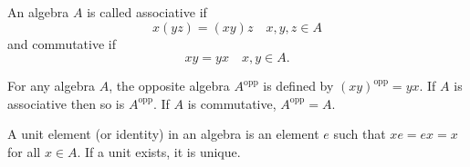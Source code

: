An algebra $A$ is called associative if
$$x(yz) = (xy)z \quad x, y, z \in A$$
and commutative if
$$xy = yx \quad x, y \in A.$$

For any algebra $A$, the opposite algebra $A^{\operatorname{opp}}$ is defined by $(xy)^{\operatorname{opp}} = yx$. If $A$ is associative then so is $A^{\operatorname{opp}}$. If $A$ is commutative, $A^{\operatorname{opp}} = A$.

A unit element (or identity) in an algebra is an element $e$ such that $xe = ex = x$ for all $x \in A$. If a unit exists, it is unique.

